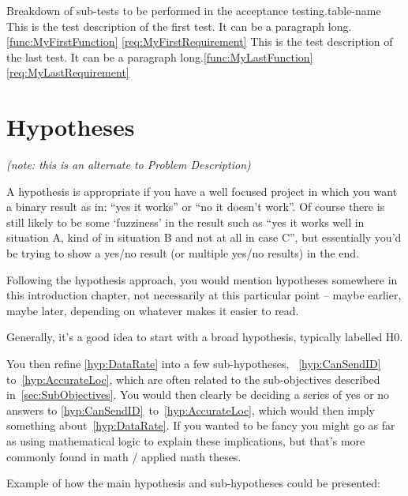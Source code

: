 \begin{TestTable}{Breakdown of sub-tests to be performed in the acceptance testing.}{table-name}
   {This is the test description of the first test.   It can be a paragraph long.}{\ref{func:MyFirstFunction}} {\ref{req:MyFirstRequirement}}
    {This is the test description of the last test.    It can be a paragraph long.}{\ref{func:MyLastFunction}}  {\ref{req:MyLastRequirement}}
\end{TestTable}

\section{Hypotheses}

\emph{(note: this is an alternate to Problem Description)}

A hypothesis is appropriate if you have a well focused project in which you want a binary result as in: ``yes it works'' or ``no it doesn't work''. Of course there is still likely to be some `fuzziness' in the result such as ``yes it works well in situation A, kind of in situation B and not at all in case C'', but essentially you'd be trying to show a yes/no result (or multiple yes/no results) in the end.

Following the hypothesis approach, you would mention hypotheses somewhere in this introduction chapter, not necessarily at this particular point -- maybe earlier, maybe later, depending on whatever makes it easier to read.

Generally, it's a good idea to start with a broad hypothesis, typically labelled H0.

You then refine \ref{hyp:DataRate} into a few sub-hypotheses, \eg~\ref{hyp:CanSendID} to~\ref{hyp:AccurateLoc}, which are often related to the sub-objectives described in~\ref{sec:SubObjectives}. You would then clearly be deciding a series of yes or no answers to \ref{hyp:CanSendID}~to~\ref{hyp:AccurateLoc}, which would then imply something about~\ref{hyp:DataRate}. If you wanted to be fancy you might go as far as using mathematical logic to explain these implications, but that's more commonly found in math / applied math theses.

Example of how the main hypothesis and sub-hypotheses could be presented:


